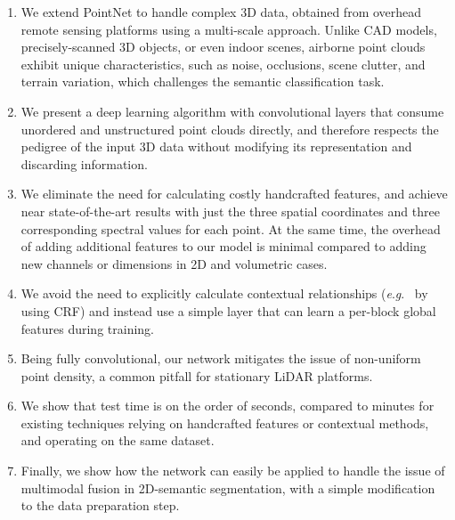\documentclass[final,3p,times,twocolumn,authoryear]{elsarticle}
\newcommand{\eg}{\textit{e}.\textit{g}.}
\begin{document}
\begin{enumerate}
\item We extend PointNet to handle complex 3D data, obtained from overhead remote sensing platforms using a multi-scale approach.
Unlike CAD models, precisely-scanned 3D objects, or even indoor scenes, airborne point clouds exhibit unique characteristics, such as noise, occlusions, scene clutter, and terrain variation, which challenges the semantic classification task.
\item We present a deep learning algorithm with convolutional layers that consume unordered and unstructured point clouds directly, and therefore respects the pedigree of the input 3D data without modifying its representation and discarding information. 
\item We eliminate the need for calculating costly handcrafted features, and achieve near state-of-the-art results with just the three spatial coordinates and three corresponding spectral values for each point. At the same time, the overhead of adding additional features to our model is minimal compared to adding new channels or dimensions in 2D
and volumetric cases.
\item We avoid the need to explicitly calculate contextual relationships (\eg~ by using CRF) and instead use a simple layer that can learn a per-block global features during training. 
\item Being fully convolutional, our network mitigates the issue of non-uniform point density, a common pitfall for stationary LiDAR platforms. 
\item We show that test time is on the order of seconds, compared to minutes for existing techniques relying on handcrafted features or contextual methods, and operating on the same dataset.
\item Finally, we show how the network can easily be applied to handle the issue of multimodal fusion in 2D-semantic segmentation, with a simple modification to the data preparation step. 
\end{enumerate}

\end{document}
